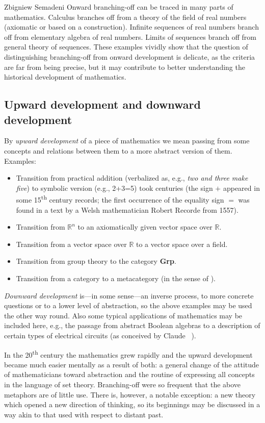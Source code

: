 \begin{artengenv}{Zbigniew Semadeni}
Onward branching-off can be traced in many parts of mathematics.  
Calculus branches off from a theory of the field of real numbers (axiomatic or 
based on a construction). 
Infinite sequences of real numbers branch off from elementary algebra of real numbers. 
Limits of sequences branch off from general theory of sequences. 
These examples vividly show that the question of distinguishing branching-off from 
onward development is delicate, as the criteria are far from being precise, but it 
may contribute to better understanding the historical development of mathematics. 

\subsection{Upward development and downward development}
By \textit{upward development} of a piece of mathematics we mean passing from some 
concepts and relations between them to a more abstract version of them. Examples: 
\begin{itemize}
\item Transition from practical addition (verbalized as, e.g., \textit{two and 
three make five}) to symbolic version (e.g., 2+3=5) took centuries (the sign $+$ 
appeared in some 15\textsuperscript{th} century records; the first occurrence of the equality 
sign $=$ was found in a text by a Welsh mathematician Robert Recorde from 1557). 
\item Transition from $\mathbb{R}^n$ 
to an axiomatically given vector space over $\mathbb{R}$.  
\item Transition from a vector space over $\mathbb{R}$ 
to a vector space over a field. 
\item Transition from group theory to the category \textbf{Grp}. 
\item Transition from a category to a metacategory (in the sense 
of \parencite[pp.7--11]{Working}). 
\end{itemize}

\textit{Downward development} is---in some sense---an inverse process, 
to more concrete questions or to a lower level of abstraction, so the above examples 
may be used the other way round. Also some typical applications of mathematics 
may be included here, e.g., the passage from abstract Boolean algebras to a 
description of certain types of electrical circuits (as conceived by Claude \citeauthor{Shannon_symbolic_1936}~\parencite*{Shannon_symbolic_1936}).

In the 20\textsuperscript{th} century the mathematics grew rapidly and the upward development became 
much easier mentally as a result of both: a general change of the attitude of 
mathematicians toward abstraction and the routine of expressing all concepts in 
the language of set theory. 
Branching-off were so frequent that the above metaphors are of little use. 
There is, however, a notable exception: a new theory which opened a new direction 
of thinking, so its beginnings may be discussed in a way akin to that used with 
respect to distant past.   


\end{artengenv}
